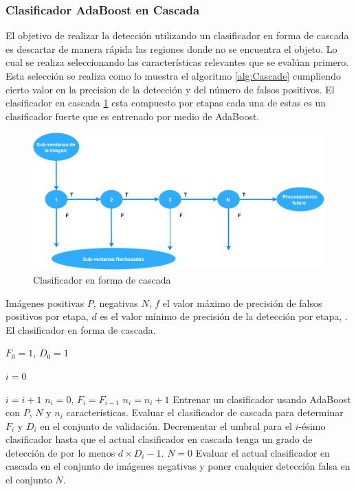 \subsubsection{Clasificador AdaBoost en Cascada}\label{sssec:AdaboostCascade}   

El objetivo de realizar la detección utilizando un clasificador en forma de cascada es descartar de manera rápida las regiones donde no se encuentra el objeto. Lo cual se realiza seleccionando las características relevantes que se evalúan primero.  
Esta selección se realiza como lo muestra el algoritmo \ref{alg:Cascade}  cumpliendo cierto valor en la precision  de la detección y del número de falsos positivos. 
El clasificador en cascada \ref{fig:Cascade} esta compuesto por etapas cada una de estas es un clasificador fuerte que es entrenado por medio de AdaBoost. 

\begin{figure}[h!]
\begin{center}
\includegraphics[scale=.5]{./Figures/DCascade.png}
\end{center}
\caption{Clasificador en forma de cascada}
\label{fig:Cascade}
\end{figure} 


\begin{algorithm}
\begin{algorithmic}[1]
\REQUIRE Imágenes positivas $P$, negativas $N$, $f$ el valor máximo de precisión de falsos positivos por etapa, $d$ es el valor mínimo de precisión de la detección por etapa, . 
\ENSURE El clasificador en forma de cascada.  

\STATE  $F_0 = 1$, $D_0=1$

\STATE  $i=0$ 

	\STATE $i=i+1$
	\STATE $n_i=0$, $F_i=F_{i-1}$
		\STATE $n_i = n_i +1$ 
		\STATE Entrenar un clasificador usando AdaBoost con $P$, $N$ y $n_i$ características. 
		\STATE Evaluar el clasificador de cascada para determinar $F_i$ y $D_i$ en el conjunto de validación. 
		\STATE Decrementar el umbral para el $i$-ésimo clasificador hasta que el actual clasificador en cascada tenga un grado 			de detección de por lo menos $d \times D_i-1$.
	\ENDWHILE
	\STATE $N=0$ 
		\STATE Evaluar el actual clasificador en cascada en el conjunto de imágenes negativas y poner cualquier detección 				falsa en el conjunto $N$.
	\ENDIF

\ENDWHILE    
\caption{}\label{alg:Cascade} 
\end{algorithmic}
\end{algorithm} 


